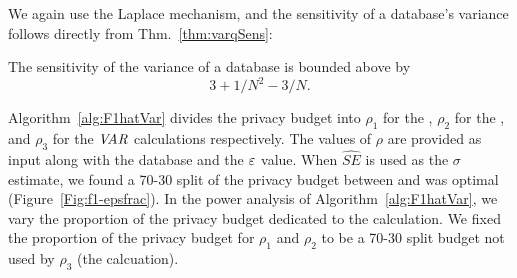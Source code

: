 We again use the Laplace mechanism, and the sensitivity of a database's variance follows directly from Thm.~\ref{thm:varqSens}:



\begin{corollary}
\label{thm:varsens}
The sensitivity of the variance of a database is bounded above by
$$ 3 + 1/N^2 - 3/N.$$
\end{corollary}

Algorithm~\ref{alg:F1hatVar} divides the privacy budget into $\rho_1$ for the \sa, $\rho_2$ for the \se, and $\rho_3$ for the $\textit{VAR}$ calculations respectively.  The values of $\rho$ are provided as input along with the database \x and the $\varepsilon$ value. When $\widehat{SE}$ is used as the $\sigma$ estimate, we found a 70-30 split of the privacy budget between \sa and \se was optimal (Figure~\ref{Fig:f1-epsfrac}).   In the power analysis of Algorithm~\ref{alg:F1hatVar}, we vary the proportion of the privacy budget dedicated to the \var calculation.  We fixed the proportion of the privacy budget for $\rho_1$ and $\rho_2$ to be a 70-30 split budget not used by $\rho_3$ (the \var calcuation).  



